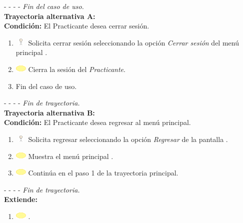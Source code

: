 - - - - \textit{Fin del caso de uso.} \\

\textbf{\large{Trayectoria alternativa A:}} \\
\textbf{Condición: } El Practicante desea cerrar sesión.

\begin{enumerate}
	\item \includegraphics[width=15pt, height=10pt]{./Figuras/iconosCU/usuario.png} Solicita cerrar sesión seleccionando la opción \textit{Cerrar sesión} del menú principal .
	\item \includegraphics[width=15pt]{./Figuras/iconosCU/herramienta.png} Cierra la sesión del \textit{Practicante}.
	\item Fin del caso de uso.
\end{enumerate}

- - - - \textit{Fin de trayectoria.} \\

\textbf{\large{Trayectoria alternativa B:}} \\
\textbf{Condición: } El Practicante desea regresar al menú principal.

\begin{enumerate}
	\item \includegraphics[width=15pt, height=10pt]{./Figuras/iconosCU/usuario.png} Solicita regresar seleccionando la opción \textit{Regresar} de la pantalla .
	\item \includegraphics[width=15pt]{./Figuras/iconosCU/herramienta.png} Muestra el menú principal .
	\item \includegraphics[width=15pt]{./Figuras/iconosCU/herramienta.png} Continúa en el paso 1 de la trayectoria principal.
\end{enumerate}

- - - - \textit{Fin de trayectoria.} \\

\textbf{\large{Extiende:}}\\

\begin{enumerate}
	\item \includegraphics[width=15pt]{./Figuras/iconosCU/herramienta.png} .
\end{enumerate}
\clearpage